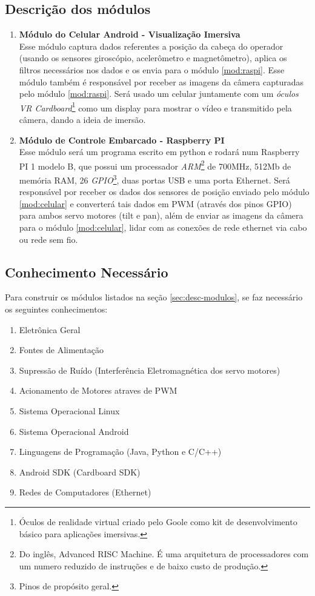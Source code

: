 \documentclass[12pt,a4paper]{article}
\begin{document}
\subsection{Descrição dos módulos \label{sec:desc-modulos}}
\begin{enumerate}
\item \textbf{Módulo do Celular Android - Visualização Imersiva\label{mod:celular}}\\
	Esse módulo captura dados referentes a posição da cabeça do operador (usando os sensores giroscópio, acelerômetro e magnetômetro), aplica os filtros necessários nos dados e os envia para o módulo \ref{mod:raspi}. Esse módulo também é responsável por receber as imagens da câmera capturadas pelo módulo \ref{mod:raspi}. Será usado um celular juntamente com um \emph{óculos VR Cardboard}\footnote{Óculos de realidade virtual criado pelo Goole como kit de desenvolvimento básico para aplicações imersivas.} como um display para mostrar o vídeo e transmitido pela câmera, dando a ideia de imersão.
\item \textbf{Módulo de Controle Embarcado - Raspberry PI\label{mod:raspi}}\\
	Esse módulo será um programa escrito em python e rodará num Raspberry PI 1 modelo B, que possui um processador \emph{ARM}\footnote{Do inglês, Advanced RISC Machine. É uma arquitetura de processadores com um numero reduzido de instruções e de baixo custo de produção.} de 700MHz, 512Mb de memória RAM, 26 \emph{GPIO}\footnote{Pinos de propósito geral.}, duas portas USB e uma porta Ethernet. Será responsável por receber os dados dos sensores de posição enviado pelo módulo \ref{mod:celular} e converterá tais dados em PWM (através dos pinos GPIO) para ambos servo motores (tilt e pan), além de enviar as imagens da câmera para o módulo \ref{mod:celular}, lidar com as conexões de rede ethernet via cabo ou rede sem fio.
\end{enumerate}

\subsection{Conhecimento Necessário}
	Para construir os módulos listados na seção \ref{sec:desc-modulos}, se faz necessário os seguintes conhecimentos:
\begin{enumerate}[noitemsep]
	\item Eletrônica Geral
	\item Fontes de Alimentação
	\item Supressão de Ruído (Interferência Eletromagnética dos servo motores)
	\item Acionamento de Motores atraves de PWM
	\item Sistema Operacional Linux
	\item Sistema Operacional Android
	\item Linguagens de Programação (Java, Python e C/C++)
	\item Android SDK (Cardboard SDK)
	\item Redes de Computadores (Ethernet)
\end{enumerate}
\end{document}
